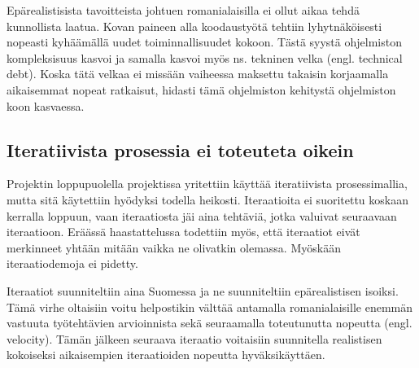 \documentclass[a4paper]{article}
\begin{document}
Epärealistisista tavoitteista johtuen romanialaisilla ei ollut aikaa tehdä kunnollista laatua. Kovan paineen alla koodaustyötä tehtiin lyhytnäköisesti nopeasti kyhäämällä uudet toiminnallisuudet kokoon. Tästä syystä ohjelmiston kompleksisuus kasvoi ja samalla kasvoi myös ns. tekninen velka (engl. technical debt). Koska tätä velkaa ei missään vaiheessa maksettu takaisin korjaamalla aikaisemmat nopeat ratkaisut, hidasti tämä ohjelmiston kehitystä ohjelmiston koon kasvaessa.

\subsection{Iteratiivista prosessia ei toteuteta oikein}

Projektin loppupuolella projektissa yritettiin käyttää iteratiivista prosessimallia, mutta sitä käytettiin hyödyksi todella heikosti. Iteraatioita ei suoritettu koskaan kerralla loppuun, vaan iteraatiosta jäi aina tehtäviä, jotka valuivat seuraavaan iteraatioon. Eräässä haastattelussa todettiin myös, että iteraatiot eivät merkinneet yhtään mitään vaikka ne olivatkin olemassa. Myöskään iteraatiodemoja ei pidetty.

Iteraatiot suunniteltiin aina Suomessa ja ne suunniteltiin epärealistisen isoiksi. Tämä virhe oltaisiin voitu helpostikin välttää antamalla romanialaisille enemmän vastuuta työtehtävien arvioinnista sekä seuraamalla toteutunutta nopeutta (engl. velocity). Tämän jälkeen seuraava iteraatio voitaisiin suunnitella realistisen kokoiseksi aikaisempien iteraatioiden nopeutta hyväksikäyttäen.
\end{document}

